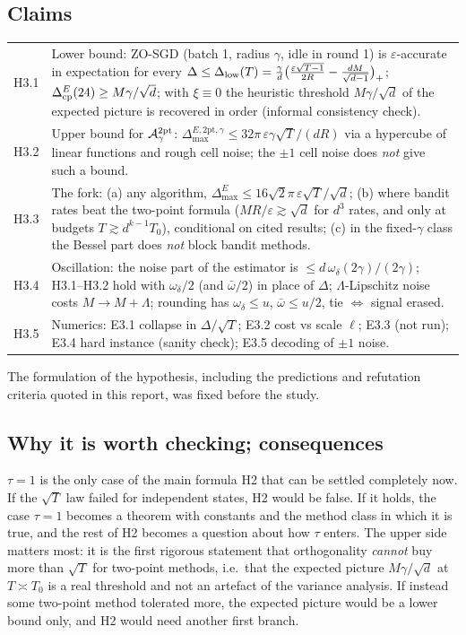 \documentclass[11pt,a4paper]{article}
\numberwithin{equation}{section}
\theoremstyle{definition}
\theoremstyle{remark}
\newcommand{\Dmax}{\Delta_{\max}}\newcommand{\Dcp}{\Delta_{\rm cp}}\newcommand{\Dlow}{\Delta_{\rm low}}
\newcommand{\wbar}{\bar\omega}\newcommand{\Atwo}{\cA^{\rm 2pt}_\gamma}
\begin{document}
\subsection{Claims}
\begin{center}\small
\begin{tabularx}{\textwidth}{@{}lX@{}}
\toprule
H3.1 & Lower bound: ZO-SGD (batch 1, radius $\gamma$, idle in round 1) is $\varepsilon$-accurate in expectation for every $\Delta\le\Dlow(T)=\frac\gamma d\big(\frac{\varepsilon\sqrt{T-1}}{2R}-\frac{dM}{\sqrt{d-1}}\big)_+$; $\Dcp^E(24)\ge M\gamma/\sqrt d$; with $\xi\equiv0$ the heuristic threshold $M\gamma/\sqrt d$ of the expected picture is recovered in order (informal consistency check). \\
H3.2 & Upper bound for $\Atwo$: $\Dmax^{E,\mathrm{2pt},\gamma}\le32\pi\,\varepsilon\gamma\sqrt T/(dR)$ via a hypercube of linear functions and rough cell noise; the $\pm1$ cell noise does \emph{not} give such a bound. \\
H3.3 & The fork: (a) any algorithm, $\Dmax^E\le16\sqrt2\pi\,\varepsilon\sqrt T/\sqrt d$; (b) where bandit rates beat the two-point formula ($MR/\varepsilon\gtrsim\sqrt d$ for $d^3$ rates, and only at budgets $T\gtrsim d^{k-1}T_0$), conditional on cited results; (c) in the fixed-$\gamma$ class the Bessel part does \emph{not} block bandit methods. \\
H3.4 & Oscillation: the noise part of the estimator is $\le d\,\omega_\delta(2\gamma)/(2\gamma)$; H3.1--H3.2 hold with $\omega_\delta/2$ (and $\wbar/2$) in place of $\Delta$; $\Lambda$-Lipschitz noise costs $M\to M+\Lambda$; rounding has $\omega_\delta\le u$, $\wbar\le u/2$, tie $\Leftrightarrow$ signal erased. \\
H3.5 & Numerics: E3.1 collapse in $\Delta/\sqrt T$; E3.2 cost vs scale $\ell$; E3.3 (not run); E3.4 hard instance (sanity check); E3.5 decoding of $\pm1$ noise. \\
\bottomrule
\end{tabularx}
\end{center}
The formulation of the hypothesis, including the predictions and refutation criteria quoted in this report, was fixed before the study.

\subsection{Why it is worth checking; consequences}
$\tau=1$ is the only case of the main formula H2 that can be settled completely now. If the $\sqrt T$ law failed for independent states, H2 would be false. If it holds, the case $\tau=1$ becomes a theorem with constants and the method class in which it is true, and the rest of H2 becomes a question about how $\tau$ enters. The upper side matters most: it is the first rigorous statement that orthogonality \emph{cannot} buy more than $\sqrt T$ for two-point methods, i.e.\ that the expected picture $M\gamma/\sqrt d$ at $T\asymp T_0$ is a real threshold and not an artefact of the variance analysis. If instead some two-point method tolerated more, the expected picture would be a lower bound only, and H2 would need another first branch.
\end{document}
